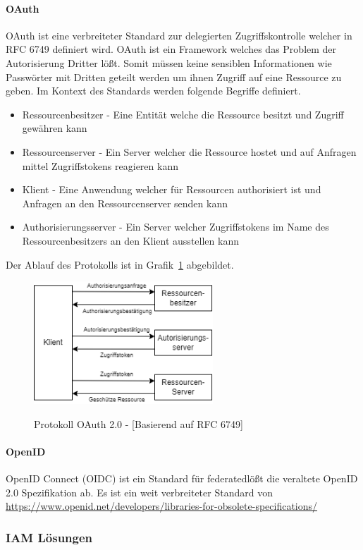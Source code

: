\documentclass[10pt]{article}
\begin{document}
\paragraph{OAuth}
OAuth ist eine verbreiteter Standard zur delegierten Zugriffskontrolle welcher in RFC 6749 definiert wird. OAuth ist ein Framework welches das Problem der Autorisierung Dritter lößt. Somit müssen keine sensiblen Informationen wie Passwörter mit Dritten geteilt werden um ihnen Zugriff auf eine Ressource zu geben. Im Kontext des Standards werden folgende Begriffe definiert.
\begin{itemize}
  \item Ressourcenbesitzer - Eine Entität welche die Ressource besitzt und Zugriff gewähren kann
  \item Ressourcenserver - Ein Server welcher die Ressource hostet und auf Anfragen mittel Zugriffstokens reagieren kann
  \item Klient - Eine Anwendung welcher für Ressourcen authorisiert ist und Anfragen an den Ressourcenserver senden kann
  \item Authorisierungsserver - Ein Server welcher Zugriffstokens im Name des Ressourcenbesitzers an den Klient ausstellen kann
\end{itemize}
Der Ablauf des Protokolls ist in Grafik~\cref{fig:oauth} abgebildet.~\cite{rfc6749}
\begin{figure}
  \centering
  \includegraphics[width=0.6\textwidth]{assets/oauth.png}
  \label{fig:oauth}
  \caption{Protokoll OAuth 2.0 - [Basierend auf RFC 6749]}
\end{figure}
\paragraph{OpenID}
OpenID Connect (OIDC) ist ein Standard für federatedlößt die veraltete OpenID 2.0 Spezifikation ab. Es ist ein weit verbreiteter Standard von
\url{https://www.openid.net/developers/libraries-for-obsolete-specifications/}
\subsubsection{IAM Lösungen}
\end{document}

